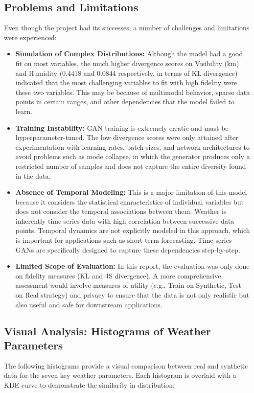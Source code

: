 \documentclass[12pt, draftclsnofoot, onecolumn]{IEEEtran}
\begin{document}
\subsection{Problems and Limitations}
Even though the project had its successes, a number of challenges and limitations were experienced:

\begin{itemize}
    \item \textbf{Simulation of Complex Distributions:} Although the model had a good fit on most variables, the much higher divergence scores on Visibility (km) and Humidity (0.4418 and 0.0844 respectively, in terms of KL divergence) indicated that the most challenging variables to fit with high fidelity were these two variables. This may be because of multimodal behavior, sparse data points in certain ranges, and other dependencies that the model failed to learn.
    
    \item \textbf{Training Instability:} GAN training is extremely erratic and must be hyperparameter-tuned. The low divergence scores were only attained after experimentation with learning rates, batch sizes, and network architectures to avoid problems such as mode collapse, in which the generator produces only a restricted number of samples and does not capture the entire diversity found in the data.
    
    \item \textbf{Absence of Temporal Modeling:} This is a major limitation of this model because it considers the statistical characteristics of individual variables but does not consider the temporal associations between them. Weather is inherently time-series data with high correlation between successive data points. Temporal dynamics are not explicitly modeled in this approach, which is important for applications such as short-term forecasting. Time-series GANs are specifically designed to capture these dependencies step-by-step.
    
    \item \textbf{Limited Scope of Evaluation:} In this report, the evaluation was only done on fidelity measures (KL and JS divergence). A more comprehensive assessment would involve measures of utility (e.g., Train on Synthetic, Test on Real strategy) and privacy to ensure that the data is not only realistic but also useful and safe for downstream applications.
\end{itemize}

\subsection{Visual Analysis: Histograms of Weather Parameters}
The following histograms provide a visual comparison between real and synthetic data for the seven key weather parameters. Each histogram is overlaid with a KDE curve to demonstrate the similarity in distribution:
\end{document}
